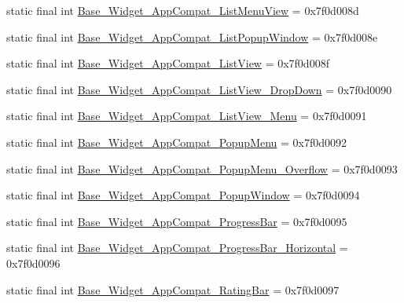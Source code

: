 \begin{DoxyCompactItemize}
\item 
static final int \mbox{\hyperlink{classcom_1_1synnapps_1_1carouselview_1_1_r_1_1style_a56c162c2e42c82bbfe85da2783a7a0d0}{Base\+\_\+\+Widget\+\_\+\+App\+Compat\+\_\+\+List\+Menu\+View}} = 0x7f0d008d
\item 
static final int \mbox{\hyperlink{classcom_1_1synnapps_1_1carouselview_1_1_r_1_1style_a9e932dd7a7c5e081ab5a9d5237c1d47f}{Base\+\_\+\+Widget\+\_\+\+App\+Compat\+\_\+\+List\+Popup\+Window}} = 0x7f0d008e
\item 
static final int \mbox{\hyperlink{classcom_1_1synnapps_1_1carouselview_1_1_r_1_1style_a6c27815b846105e0ad467056ee632c6f}{Base\+\_\+\+Widget\+\_\+\+App\+Compat\+\_\+\+List\+View}} = 0x7f0d008f
\item 
static final int \mbox{\hyperlink{classcom_1_1synnapps_1_1carouselview_1_1_r_1_1style_a3c97a30e469d4d1ff326e8a671b934ab}{Base\+\_\+\+Widget\+\_\+\+App\+Compat\+\_\+\+List\+View\+\_\+\+Drop\+Down}} = 0x7f0d0090
\item 
static final int \mbox{\hyperlink{classcom_1_1synnapps_1_1carouselview_1_1_r_1_1style_a0e37bded6fc61fa88335a570b23b6d8f}{Base\+\_\+\+Widget\+\_\+\+App\+Compat\+\_\+\+List\+View\+\_\+\+Menu}} = 0x7f0d0091
\item 
static final int \mbox{\hyperlink{classcom_1_1synnapps_1_1carouselview_1_1_r_1_1style_a29ddc94ebd3a0b1c53e3bc990d3e36e5}{Base\+\_\+\+Widget\+\_\+\+App\+Compat\+\_\+\+Popup\+Menu}} = 0x7f0d0092
\item 
static final int \mbox{\hyperlink{classcom_1_1synnapps_1_1carouselview_1_1_r_1_1style_a60e35e19980b3c7d44aecf393c547b99}{Base\+\_\+\+Widget\+\_\+\+App\+Compat\+\_\+\+Popup\+Menu\+\_\+\+Overflow}} = 0x7f0d0093
\item 
static final int \mbox{\hyperlink{classcom_1_1synnapps_1_1carouselview_1_1_r_1_1style_acede56def6713da434d52a008cc8e077}{Base\+\_\+\+Widget\+\_\+\+App\+Compat\+\_\+\+Popup\+Window}} = 0x7f0d0094
\item 
static final int \mbox{\hyperlink{classcom_1_1synnapps_1_1carouselview_1_1_r_1_1style_ab0ef21ee7d6f94ed5208df341a144b40}{Base\+\_\+\+Widget\+\_\+\+App\+Compat\+\_\+\+Progress\+Bar}} = 0x7f0d0095
\item 
static final int \mbox{\hyperlink{classcom_1_1synnapps_1_1carouselview_1_1_r_1_1style_a41b9faa3f41d683ac0dc09aeb87482dc}{Base\+\_\+\+Widget\+\_\+\+App\+Compat\+\_\+\+Progress\+Bar\+\_\+\+Horizontal}} = 0x7f0d0096
\item 
static final int \mbox{\hyperlink{classcom_1_1synnapps_1_1carouselview_1_1_r_1_1style_a571a285a626a133d9fd97783f09b50e0}{Base\+\_\+\+Widget\+\_\+\+App\+Compat\+\_\+\+Rating\+Bar}} = 0x7f0d0097

\end{DoxyCompactItemize}
